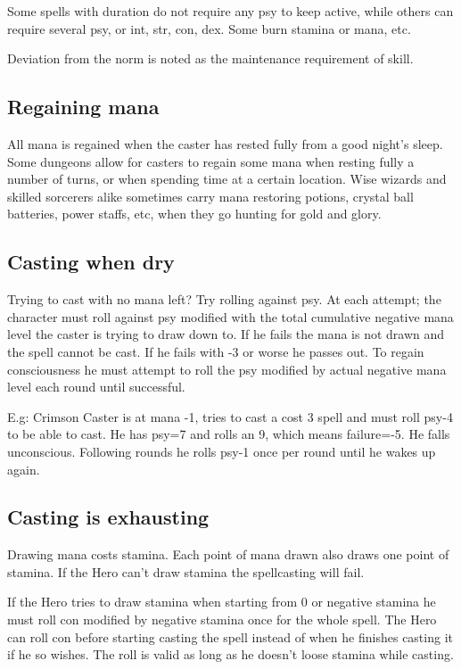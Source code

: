 Some spells with duration do not require any psy to keep active, while others can require several psy, or int, str, con, dex. Some burn stamina or mana, etc.

Deviation from the norm is noted as the maintenance requirement of skill.



\subsection*{Regaining mana}
All mana is regained when the caster has rested fully from a good night's sleep. Some dungeons allow for casters to regain some mana when resting fully a number of turns, or when spending time at a certain location.
Wise wizards and skilled sorcerers alike sometimes carry mana restoring potions, crystal ball batteries, power staffs, etc, when they go hunting for gold and glory.


\subsection*{Casting when dry}
Trying to cast with no mana left? Try rolling against psy. At each attempt; the character must roll against psy modified with the total cumulative negative mana level the caster is trying to draw down to. If he fails the mana is not drawn and the spell cannot be cast. If he fails with -3 or worse he passes out. To regain consciousness he must attempt to roll the psy modified by actual negative mana level each round until successful.

E.g: Crimson Caster is at mana -1, tries to cast a cost 3 spell and must roll psy-4 to be able to cast. He has psy=7 and rolls an 9, which means failure=-5. He falls unconscious. Following rounds he rolls psy-1 once per round until he wakes up again.


\subsection*{Casting is exhausting}
Drawing mana costs stamina. Each point of mana drawn also draws one point of stamina. If the Hero can't draw stamina the spellcasting will fail.

If the Hero tries to draw stamina when starting from 0 or negative stamina he must roll con modified by negative stamina once for the whole spell. The Hero can roll con before starting casting the spell instead of when he finishes casting it if he so wishes. The roll is valid as long as he doesn't loose stamina while casting.


